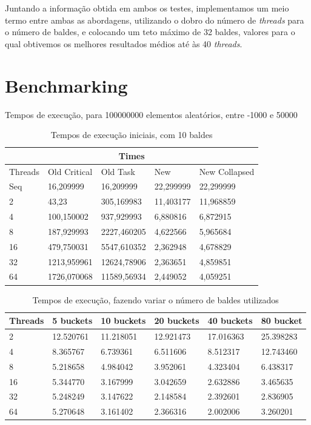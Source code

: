 \documentclass[a4paper]{report}
\begin{document}
Juntando a informação obtida em ambos os testes, implementamos um meio termo
entre ambas as abordagens, utilizando o dobro do número de \textit{threads} para
o número de baldes, e colocando um teto máximo de 32 baldes, valores para o qual
obtivemos os melhores resultados médios até às 40 \textit{threads}.

\appendix

\chapter{Benchmarking}
Tempos de execução, para 100000000 elementos aleatórios, entre -1000 e 50000
\begin{table}[h]
\centering
\begin{tabular}{|l|l|l|l|l|}
\hline
\multicolumn{5}{|c|}{Times}                                      \\ \hline
Threads & Old Critical & Old Task    & New       & New Collapsed \\ \hline
Seq     & 16,209999    & 16,209999   & 22,299999 & 22,299999     \\ \hline
2       & 43,23        & 305,169983  & 11,403177 & 11,968859     \\ \hline
4       & 100,150002   & 937,929993  & 6,880816  & 6,872915      \\ \hline
8       & 187,929993   & 2227,460205 & 4,622566  & 5,965684      \\ \hline
16      & 479,750031   & 5547,610352 & 2,362948  & 4,678829      \\ \hline
32      & 1213,959961  & 12624,78906 & 2,363651  & 4,859851      \\ \hline
64      & 1726,070068  & 11589,56934 & 2,449052  & 4,059251      \\ \hline
\end{tabular}
\caption{\label{tab:Times}Tempos de execução iniciais, com 10 baldes}
\end{table}

\begin{table}[h]
\centering
\begin{tabular}{|l|l|l|l|l|l|}
\hline
Threads & 5 buckets & 10 buckets & 20 buckets & 40 buckets & 80 bucket \\ \hline
2       & 12.520761 & 11.218051  & 12.921473  & 17.016363  & 25.398283 \\ \hline
4       & 8.365767  & 6.739361   & 6.511606   & 8.512317   & 12.743460 \\ \hline
8       & 5.218658  & 4.984042   & 3.952061   & 4.323404   & 6.438317  \\ \hline
16      & 5.344770  & 3.167999   & 3.042659   & 2.632886   & 3.465635  \\ \hline
32      & 5.248249  & 3.147622   & 2.148584   & 2.392601   & 2.836905  \\ \hline
64      & 5.270648  & 3.161402   & 2.366316   & 2.002006   & 3.260201  \\ \hline
\end{tabular}
\caption{\label{tab:fix_size}Tempos de execução, fazendo variar o
    número de baldes utilizados}
\end{table}
\end{document}
